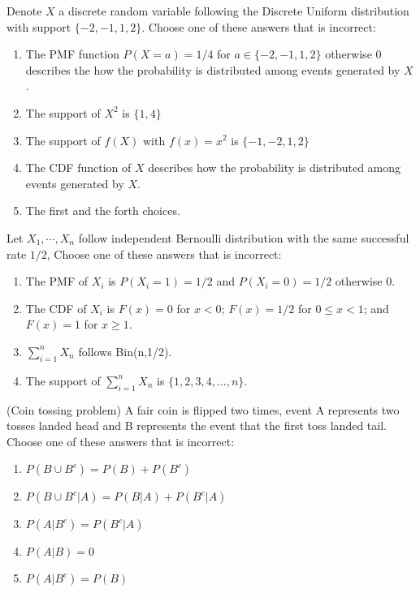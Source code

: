 \documentclass[poll_tutorial_format]{subfiles}
\begin{document}
	
	\begin{exercise}
		Denote $X$ a discrete random variable following the Discrete Uniform distribution with support $\{-2,-1,1,2\}$.
		Choose one of these answers that is incorrect: %
		\begin{enumerate}
			\item The PMF function $P(X=a)=1/4$ for $a\in \{-2,-1,1,2\}$ otherwise 0 describes the how the probability is distributed among events generated by $X$. 
			\item The support of $X^2$ is $\{1,4\}$
			\item The support of $f(X)$ with $f(x)=x^2$ is $\{-1,-2,1,2\}$  
			\item The CDF function of $X$ describes how the probability is distributed among events generated by $X$.  
			\item The first and the forth choices.
		\end{enumerate}
	\end{exercise}
	

	\begin{exercise}
		Let $X_1,\cdots , X_n$ follow independent Bernoulli distribution with the same successful rate $1/2$, 
		Choose one of these answers that is incorrect: %
		\begin{enumerate}
			\item The PMF of $X_i$ is $P(X_i=1)=1/2$ and $P(X_i=0)=1/2$ otherwise 0.
			\item The CDF of $X_i$ is $F(x)=0$ for $x<0$; $F(x)=1/2$ for $0\leq x <1$; and $F(x)=1$ for $x\geq 1$.  
			\item $\sum_{i=1}^n X_n$ follows  Bin(n,1/2).
			\item The support of $\sum_{i=1}^n X_n$ is $\{1,2,3,4,...,n\}$.
		\end{enumerate}
	\end{exercise}
	
	
	\begin{exercise}
		(Coin tossing problem) A fair coin is flipped two times, event A represents two tosses landed head and B represents the event that the first toss landed tail. 
		Choose one of these answers that is incorrect: %
		\begin{enumerate}
			\item $P(B\cup B^c )=P(B)+P(B^c)$
			\item $P(B\cup B^c |A)=P(B|A)+P(B^c|A)$
			\item $P(A|B^c)=P(B^c|A)$
			\item $P(A|B)=0$
			\item $P(A|B^c)=P(B)$
		\end{enumerate}
	\end{exercise}
	
	 
	
	
	
\end{document}
